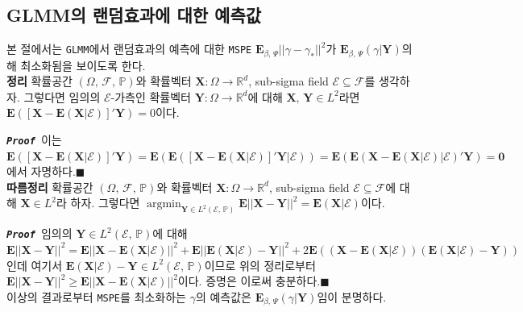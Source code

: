 \documentclass[10pt,onecolumn,twoside,a4size]{gsag3jnl}
\newcommand{\proof}{\texttt{\textit{\textbf{Proof }}}}
\DeclareMathOperator*{\argmin}{argmin}
\begin{document}
\subsection{GLMM의 랜덤효과에 대한 예측값}

본 절에서는 \texttt{GLMM}에서 랜덤효과의 예측에 대한 \texttt{MSPE} $\mathbf{E}_{\beta,\,\Psi}||\gamma-\gamma_*||^2$가 $\mathbf{E}_{\beta,\,\Psi}(\gamma\vert\mathbf{Y})$의해 최소화됨을 보이도록 한다.\\

\noindent\textsf{\textbf{정리} 확률공간 $(\Omega,\,\mathcal{F},\,\mathbb{P})$와  확률벡터 $\mathbf{X}:\Omega\to\mathbb{R}^d$, sub-sigma field $\mathcal{E}\subseteq\mathcal{F}$를 생각하자. 그렇다면 임의의 $\mathcal{E}$-가측인 확률벡터 $\mathbf{Y}:\Omega\to\mathbb{R}^d$에 대해 $\mathbf{X},\,\mathbf{Y}\in L^2$라면 $\mathbf{E}([\mathbf{X}-\mathbf{E}(\mathbf{X}\vert\mathcal{E})]'\mathbf{Y})=0$이다.}

\proof 이는 $\mathbf{E}([\mathbf{X}-\mathbf{E}(\mathbf{X}\vert\mathcal{E})]'\mathbf{Y})=\mathbf{E}(\mathbf{E}([\mathbf{X}-\mathbf{E}(\mathbf{X}\vert\mathcal{E})]'\mathbf{Y}\vert\mathcal{E}))=\mathbf{E}(\mathbf{E}(\mathbf{X}-\mathbf{E}(\mathbf{X}\vert\mathcal{E})\vert\mathcal{E})'\mathbf{Y})=\mathbf{0}$에서 자명하다.\hfill$\blacksquare$\\

\noindent\textsf{\textbf{따름정리} 확률공간 $(\Omega,\,\mathcal{F},\,\mathbb{P})$와 확률벡터 $\mathbf{X}:\Omega\to\mathbb{R}^d$, sub-sigma field $\mathcal{E}\subseteq\mathcal{F}$에 대해 $\mathbf{X}\in L^2$라 하자. 그렇다면 $\argmin_{\mathbf{Y}\in L^2(\mathcal{E},\,\mathbb{P})}\mathbf{E}||\mathbf{X}-\mathbf{Y}||^2=\mathbf{E}(\mathbf{X}\vert\mathcal{E})$이다.}

\proof 임의의 $\mathbf{Y}\in L^2(\mathcal{E},\,\mathbb{P})$에 대해 $\mathbf{E}||\mathbf{X}-\mathbf{Y}||^2=\mathbf{E}||\mathbf{X}-\mathbf{E}(\mathbf{X}\vert\mathcal{E})||^2+\mathbf{E}||\mathbf{E}(\mathbf{X}\vert\mathcal{E})-\mathbf{Y}||^2+2\mathbf{E}((\mathbf{X}-\mathbf{E}(\mathbf{X}\vert\mathcal{E}))(\mathbf{E}(\mathbf{X}\vert\mathcal{E})-\mathbf{Y}))$인데 여기서 $\mathbf{E}(\mathbf{X}\vert\mathcal{E})-\mathbf{Y}\in L^2(\mathcal{E},\,\mathbb{P})$이므로 위의 정리로부터 $\mathbf{E}||\mathbf{X}-\mathbf{Y}||^2\geq\mathbf{E}||\mathbf{X}-\mathbf{E}(\mathbf{X}\vert\mathcal{E})||^2$이다. 증명은 이로써 충분하다.\hfill$\blacksquare$\\

이상의 결과로부터 \texttt{MSPE}를 최소화하는 $\gamma$의 예측값은 $\mathbf{E}_{\beta,\,\Psi}(\gamma\vert\mathbf{Y})$임이 분명하다.
\end{document}
